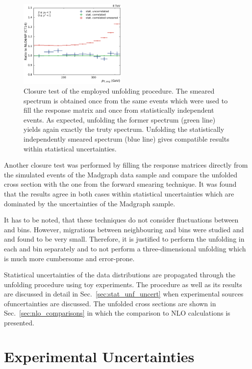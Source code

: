 \begin{figure}[htp]
    \includegraphics[width=0.47\textwidth]{figures/measurement/unf_nlo_check_yb2ys0.pdf}
    \caption[Closure check of unfolding technique]{Closure test of the employed unfolding
    procedure. The smeared spectrum is obtained once from the same events which
were used to fill the response matrix and once from statistically independent
events. As expected, unfolding the former spectrum (green line) yields again exactly the
truty spectrum. Unfolding the statistically independently smeared spectrum
(blue line) gives compatible results within statistical uncertainties.}
    \label{fig:unf_closure_test}
\end{figure}

Another closure test was performed by filling the response matrices directly
from the simulated events of the Madgraph data sample and compare the unfolded
cross section with the one from the forward smearing technique. It was found
that the results agree in both cases within statistical uncertainties which are
dominated by the uncertainties of the Madgraph sample.

It has to be noted, that these
techniques do not consider fluctuations between \ystar and \yboost bins.
However, migrations between neighbouring \ystar and \yboost bins were studied
and and found to be very small. Therefore, it is justified to perform the
unfolding in each \ystar and \yboost bin separately and to not perform a
three-dimensional unfolding which is much more cumbersome and error-prone.

Statistical uncertainties of the data distributions are propagated through the
unfolding procedure using toy experiments. The procedure as well as its results
are discussed in detail in Sec.~\ref{sec:stat_unf_uncert} when experimental
sources ofuncertainties are discussed. The unfolded cross sections are shown in
Sec.~\ref{sec:nlo_comparisons} in which the comparison to NLO calculations is
presented.

\section{Experimental Uncertainties}
\label{sec:experimental_uncertainties}

